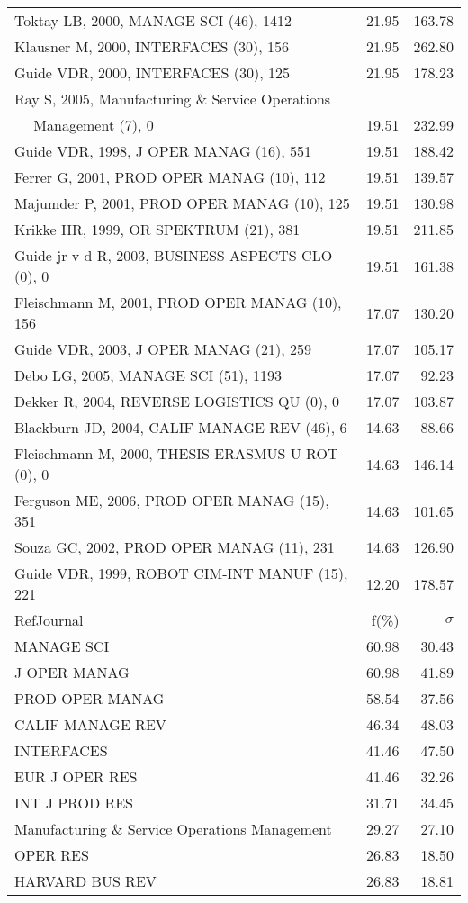 \documentclass[a4paper,11pt]{report}
\begin{document}
\begin{landscape}
\begin{table}[!ht]
{\begin{tabular}{|l r r|}
Toktay LB, 2000, MANAGE SCI (46), 1412 & 21.95 & 163.78\\
Klausner M, 2000, INTERFACES (30), 156 & 21.95 & 262.80\\
Guide VDR, 2000, INTERFACES (30), 125 & 21.95 & 178.23\\
Ray S, 2005, Manufacturing \& Service Operations &  & \\
$\quad$ Management (7), 0 & 19.51 & 232.99\\
Guide VDR, 1998, J OPER MANAG (16), 551 & 19.51 & 188.42\\
Ferrer G, 2001, PROD OPER MANAG (10), 112 & 19.51 & 139.57\\
Majumder P, 2001, PROD OPER MANAG (10), 125 & 19.51 & 130.98\\
Krikke HR, 1999, OR SPEKTRUM (21), 381 & 19.51 & 211.85\\
Guide jr v d R, 2003, BUSINESS ASPECTS CLO (0), 0 & 19.51 & 161.38\\
Fleischmann M, 2001, PROD OPER MANAG (10), 156 & 17.07 & 130.20\\
Guide VDR, 2003, J OPER MANAG (21), 259 & 17.07 & 105.17\\
Debo LG, 2005, MANAGE SCI (51), 1193 & 17.07 & 92.23\\
Dekker R, 2004, REVERSE LOGISTICS QU (0), 0 & 17.07 & 103.87\\
Blackburn JD, 2004, CALIF MANAGE REV (46), 6 & 14.63 & 88.66\\
Fleischmann M, 2000, THESIS ERASMUS U ROT (0), 0 & 14.63 & 146.14\\
Ferguson ME, 2006, PROD OPER MANAG (15), 351 & 14.63 & 101.65\\
Souza GC, 2002, PROD OPER MANAG (11), 231 & 14.63 & 126.90\\
Guide VDR, 1999, ROBOT CIM-INT MANUF (15), 221 & 12.20 & 178.57\\
\hline
\hline
RefJournal & f(\%) & $\sigma$\\
\hline
MANAGE SCI & 60.98 & 30.43\\
J OPER MANAG & 60.98 & 41.89\\
PROD OPER MANAG & 58.54 & 37.56\\
CALIF MANAGE REV & 46.34 & 48.03\\
INTERFACES & 41.46 & 47.50\\
EUR J OPER RES & 41.46 & 32.26\\
INT J PROD RES & 31.71 & 34.45\\
Manufacturing \& Service Operations Management & 29.27 & 27.10\\
OPER RES & 26.83 & 18.50\\
HARVARD BUS REV & 26.83 & 18.81\\
\hline
\end{tabular}
}
\end{table}

\end{landscape}
\end{document}
